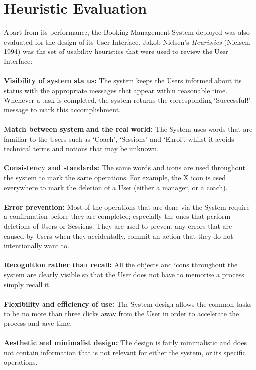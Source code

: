 \documentclass{l3proj}
\begin{document}
\section{Heuristic Evaluation}
Apart from its performance, the Booking Management System deployed was also evaluated for the design of its User Interface. Jakob Nielsen's \emph{Heuristics} (Nielsen, 1994) was the set of usability heuristics that were used to review the User Interface:\\
\\
\textbf{Visibility of system status:}
The system keeps the Users informed about its status with the appropriate messages that appear within reasonable time. Whenever a task is completed, the system returns the corresponding `Successful!' message to mark this accomplishment.\\
 \\
\textbf{Match between system and the real world:}
The System uses words that are familiar to the Users such as `Coach', `Sessions' and `Enrol', whilst it avoids technical terms and notions that may be unknown.\\
 \\
\textbf{Consistency and standards:}
The same words and icons are used throughout the system to mark the same operations. For example, the X icon is used everywhere to mark the deletion of a User (either a manager, or a coach).\\
 \\
\textbf{Error prevention:}
Most of the operations that are done via the System require a confirmation before they are completed; especially the ones that perform deletions of Users or Sessions. They are used to prevent any errors that are caused by Users when they accidentally, commit an action that they do not intentionally want to.\\
 \\
\textbf{Recognition rather than recall:}
All the objects and icons throughout the system are clearly visible so that the User does not have to memorise a process simply recall it.\\
 \\
\textbf{Flexibility and efficiency of use:}
The System design allows the common tasks to be no more than three clicks away from the User in order to accelerate the process and save time.\\
 \\
\textbf{Aesthetic and minimalist design:}
The design is fairly minimalistic and does not contain information that is not relevant for either the system, or its specific operations.\\
\end{document}

